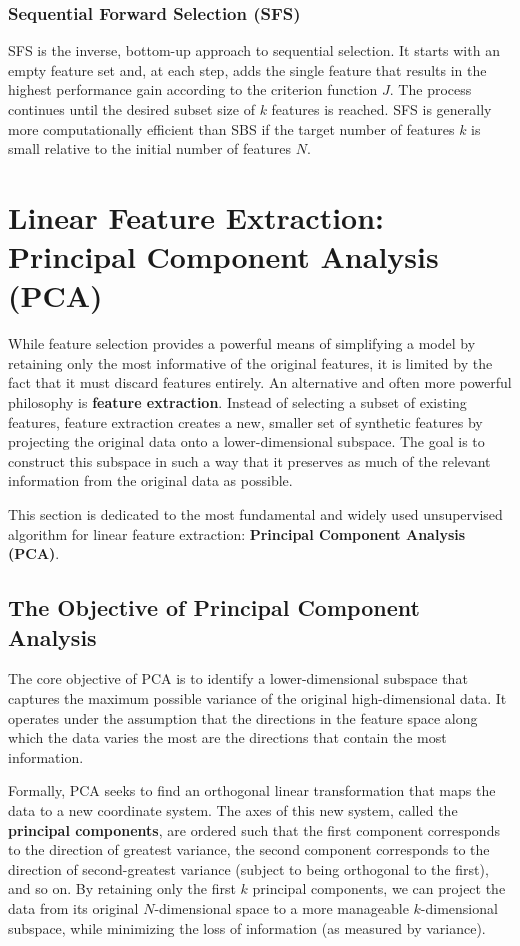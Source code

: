 \subsubsection{Sequential Forward Selection (SFS)}
SFS is the inverse, bottom-up approach to sequential selection. It starts with an empty feature set and, at each step, adds the single feature that results in the highest performance gain according to the criterion function $J$. The process continues until the desired subset size of $k$ features is reached. SFS is generally more computationally efficient than SBS if the target number of features $k$ is small relative to the initial number of features $N$.

\section{Linear Feature Extraction: Principal Component Analysis (PCA)}
\label{sec:pca}

While feature selection provides a powerful means of simplifying a model by retaining only the most informative of the original features, it is limited by the fact that it must discard features entirely. An alternative and often more powerful philosophy is \textbf{feature extraction}. Instead of selecting a subset of existing features, feature extraction creates a new, smaller set of synthetic features by projecting the original data onto a lower-dimensional subspace. The goal is to construct this subspace in such a way that it preserves as much of the relevant information from the original data as possible.

This section is dedicated to the most fundamental and widely used unsupervised algorithm for linear feature extraction: \textbf{Principal Component Analysis (PCA)}.

\subsection{The Objective of Principal Component Analysis}
\label{subsec:pca_objective}
The core objective of PCA is to identify a lower-dimensional subspace that captures the maximum possible variance of the original high-dimensional data. It operates under the assumption that the directions in the feature space along which the data varies the most are the directions that contain the most information.

Formally, PCA seeks to find an orthogonal linear transformation that maps the data to a new coordinate system. The axes of this new system, called the \textbf{principal components}, are ordered such that the first component corresponds to the direction of greatest variance, the second component corresponds to the direction of second-greatest variance (subject to being orthogonal to the first), and so on. By retaining only the first $k$ principal components, we can project the data from its original $N$-dimensional space to a more manageable $k$-dimensional subspace, while minimizing the loss of information (as measured by variance).

